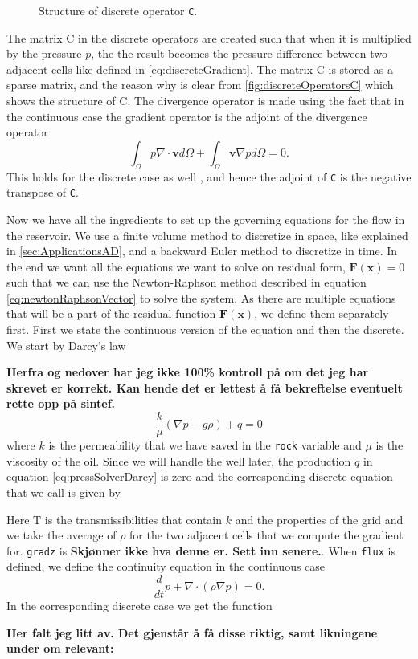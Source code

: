 \begin{figure}
    \caption{Structure of discrete operator \texttt{C}.}
    \label{fig:discreteOperatorsC}
\end{figure}
The matrix C in the discrete operators are created such that when it is multiplied by the pressure $p$, the the result becomes the pressure difference between two adjacent cells like defined in \eqref{eq:discreteGradient}. The matrix C is stored as a sparse matrix, and the reason why is clear from \autoref{fig:discreteOperatorsC} which shows the structure of C. The divergence operator is made using the fact that in the continuous case the gradient operator is the adjoint of the divergence operator
\begin{equation*}
    \int_\Omega p\nabla \cdot \textbf{v} d\Omega + \int_\Omega \textbf{v}\nabla p d\Omega = 0.
\end{equation*}
This holds for the discrete case as well \emph{\citep{lieMrstUrl}}, and hence the adjoint of \texttt{C} is the negative transpose of \texttt{C}.

Now we have all the ingredients to set up the governing equations for the flow in the reservoir. We use a finite volume method to discretize in space, like explained in \autoref{sec:ApplicationsAD}, and a backward Euler method to discretize in time. In the end we want all the equations we want to solve on residual form, $\boldsymbol{F}(\boldsymbol{x}) = 0$ such that we can use the Newton-Raphson method described in equation \eqref{eq:newtonRaphsonVector} to solve the system. As there are multiple equations that will be a part of the residual function $\boldsymbol{F}(\boldsymbol{x})$, we define them separately first. First we state the continuous version of the equation and then the discrete. We start by Darcy's law

\textbf{Herfra og nedover har jeg ikke 100\% kontroll på om det jeg har skrevet er korrekt. Kan hende det er lettest å få bekreftelse eventuelt rette opp på sintef.}
\begin{equation*}
    \frac{k}{\mu}(\nabla p - g\rho) + q = 0
    \label{eq:pressSolverDarcy}
\end{equation*}
where $k$ is the permeability that we have saved in the \texttt{rock} variable and $\mu$ is the viscosity of the oil. Since we will handle the well later, the production $q$ in equation \eqref{eq:pressSolverDarcy} is zero and the corresponding discrete equation that we call  is given by 

Here T is the transmissibilities that contain $k$ and the properties of the grid and we take the average of $\rho$ for the two adjacent cells that we compute the gradient for. \texttt{gradz} is \textbf{Skjønner ikke hva denne er. Sett inn senere.}. When \texttt{flux} is defined, we define the continuity equation in the continuous case
\begin{equation*}
    \frac{d}{dt}p + \nabla\cdot(\rho\nabla p) = 0.
\end{equation*}
In the corresponding discrete case we get the function

\textbf{Her falt jeg litt av. Det gjenstår å få disse riktig, samt likningene under om relevant:}


